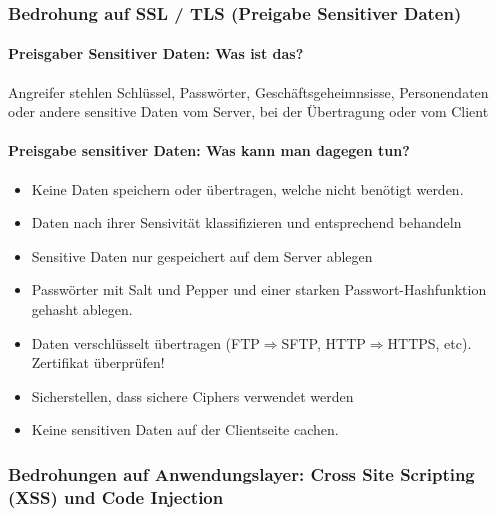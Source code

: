 \documentclass[10pt,a4paper]{article}
\begin{document}
\subsubsection*{Bedrohung auf SSL / TLS (Preigabe Sensitiver Daten)}
\paragraph*{Preisgaber Sensitiver Daten: Was ist das?} Angreifer stehlen Schlüssel, Passwörter, Geschäftsgeheimnsisse,
Personendaten oder andere sensitive Daten vom Server, bei der Übertragung oder vom Client

\paragraph*{Preisgabe sensitiver Daten: Was kann man dagegen tun?}
\begin{itemize}[noitemsep,topsep=0pt,leftmargin=*]
    \item Keine Daten speichern oder übertragen, welche nicht benötigt werden.
    \item Daten nach ihrer Sensivität klassifizieren und entsprechend behandeln
    \item Sensitive Daten nur gespeichert auf dem Server ablegen
    \item Passwörter mit Salt und Pepper und einer starken Passwort-Hashfunktion gehasht ablegen.
    \item Daten verschlüsselt übertragen (FTP$\Rightarrow$SFTP, HTTP$\Rightarrow$HTTPS, etc). Zertifikat überprüfen!
    \item Sicherstellen, dass sichere Ciphers verwendet werden
    \item Keine sensitiven Daten auf der Clientseite cachen.
\end{itemize}

\subsubsection*{Bedrohungen auf Anwendungslayer: Cross Site Scripting (XSS) und Code Injection}
\end{document}
